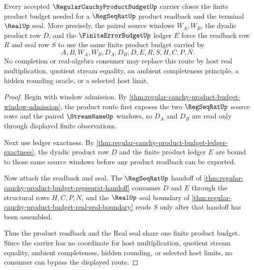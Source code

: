 \begin{theorem}
\label{thm:regular-cauchy-product-budget-product-closure-budget}
Every accepted $\RegularCauchyProductBudgetUp$ carrier closes the finite product budget needed for a $\RegSeqRatUp$ product readback and the terminal $\RealUp$ seal. More precisely, the paired source windows $W_A,W_B$, the dyadic product row $D$, and the $\FiniteErrorBudgetUp$ ledger $E$ force the readback row $R$ and seal row $S$ to use the same finite product budget carried by
$$
A,B,W_A,W_B,D_A,D_B,D,E,R,S,H,C,P,N.
$$
No completion or real-algebra consumer may replace this route by host real multiplication, quotient stream equality, an ambient completeness principle, a hidden rounding oracle, or a selected host limit.
\end{theorem}
\begin{proof}
Begin with window admission. By \autoref{thm:regular-cauchy-product-budget-window-admission}, the product route first exposes the two $\RegSeqRatUp$ source rows and the paired $\StreamNameUp$ windows, so $D_A$ and $D_B$ are read only through displayed finite observations.

Next use ledger exactness. By \autoref{thm:regular-cauchy-product-budget-ledger-exactness}, the dyadic product row $D$ and the finite product ledger $E$ are bound to those same source windows before any product readback can be exported.

Now attach the readback and seal. The $\RegSeqRatUp$ handoff of \autoref{thm:regular-cauchy-product-budget-regseqrat-handoff} consumes $D$ and $E$ through the structural rows $H,C,P,N$, and the $\RealUp$ seal boundary of \autoref{thm:regular-cauchy-product-budget-real-seal-boundary} reads $S$ only after that handoff has been assembled.

Thus the product readback and the Real seal share one finite product budget. Since the carrier has no coordinate for host multiplication, quotient stream equality, ambient completeness, hidden rounding, or selected host limits, no consumer can bypass the displayed route.
\end{proof}

